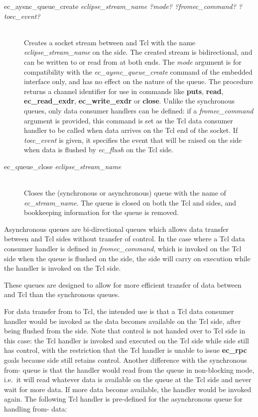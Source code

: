 \begin{description}
\item[ec_aysnc_queue_create {\it eclipse_stream_name ?mode?
?fromec_command? ?toec_event?}]\ \\
	Creates a socket stream between {\eclipse} and Tcl with the name
	{\it eclipse_stream_name\/} on the {\eclipse} side. The created
	stream is bidirectional, and can be written to or read from at both
	ends. The {\it mode\/} argument is for compatibility with the {\it
	ec_aysnc_queue_create\/} command of the embedded interface only,
	and has no effect on the nature of the queue.  The procedure
	returns a channel identifier for use in commands like {\bf puts},
	{\bf read}, {\bf ec_read_exdr}, {\bf ec_write_exdr} or {\bf
	close}. Unlike the synchronous queues, only data consumer handlers
	can be defined: if a {\it fromec_command} argument is provided,
	this command is set as the Tcl data consumer handler to be called
	when data arrives on the Tcl end of the socket. If {\it toec_event\/}
	is given, it specifies the event that will be raised on the
	{\eclipse} side when data is flushed by {\it ec_flush} on the Tcl
	side. 
\item[ec_queue_close {\it
eclipse_stream_name}]\ \\
	Closes the (synchronous or asynchronous) queue with the {\eclipse}
	name of {\it 	ec_stream_name}. The queue is closed on both the Tcl and {\eclipse}
	sides, and bookkeeping information for the queue is removed. 



\end{description}

Asynchronous queues are bi-directional queues which allows data transfer
between {\eclipse} and Tcl sides without transfer of control. 
In the case where a Tcl data consumer
handler is defined in {\it fromec_command}, which is invoked on the Tcl
side when the queue is flushed on the {\eclipse} side, the {\eclipse} side
will carry on execution while the handler is invoked on the Tcl side. 

These queues are designed to allow for more efficient transfer of data
between {\eclipse} and Tcl than the synchronous queues. 

For data transfer from
{\eclipse} to Tcl, the intended use is that a Tcl data consumer handler
 would be invoked as the data becomes available on
the Tcl side, after being flushed from the {\eclipse} side. 
Note that control is not handed over to Tcl side in this case:
the Tcl handler is
invoked and executed on the Tcl side while {\eclipse} side still has control, with the
restriction that the Tcl handler is unable to issue {\bf ec_rpc}
goals because {\eclipse} side still retains control. Another difference
with the synchronous  from-{\eclipse} queue is that the handler would read
from the queue in non-blocking mode, i.e.\ it will read whatever data is
available on the queue at the Tcl side and never wait for more data. 
If more data become
available, the handler would be invoked again. The following Tcl handler is
pre-defined for the asynchronous queue for handling from-{\eclipse} data:

